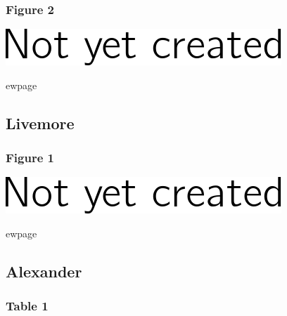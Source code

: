 \documentclass[]{article}
\begin{document}
\subsubsection{Figure 2}\label{figure-2-2}

\includegraphics{figures/laquer2-1.png}

ewpage

\subsection{Livemore}\label{livemore}

\subsubsection{Figure 1}\label{figure-1-2}

\includegraphics{figures/livemore1-1.png}

ewpage

\subsection{Alexander}\label{alexander}

\subsubsection{Table 1}\label{table-1}

\end{document}
